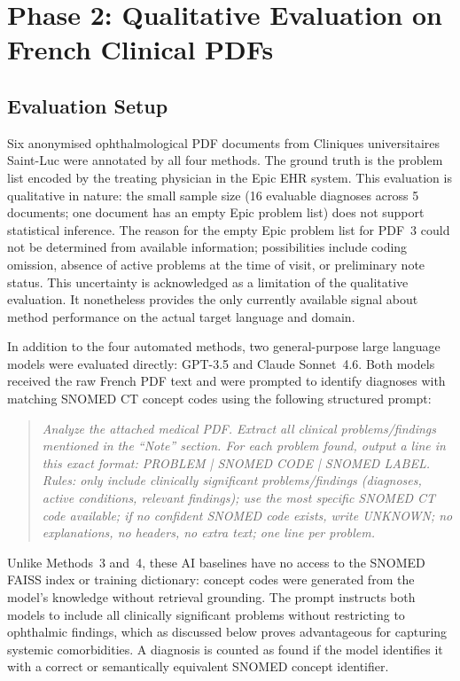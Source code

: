 \section{Phase 2: Qualitative Evaluation on French Clinical PDFs}

\subsection{Evaluation Setup}

Six anonymised ophthalmological PDF documents from Cliniques universitaires Saint-Luc were annotated by all four methods. The ground truth is the problem list encoded by the treating physician in the Epic EHR system. This evaluation is qualitative in nature: the small sample size (16 evaluable diagnoses across 5 documents; one document has an empty Epic problem list) does not support statistical inference. The reason for the empty Epic problem list for PDF~3 could not be determined from available information; possibilities include coding omission, absence of active problems at the time of visit, or preliminary note status. This uncertainty is acknowledged as a limitation of the qualitative evaluation. It nonetheless provides the only currently available signal about method performance on the actual target language and domain.

In addition to the four automated methods, two general-purpose large language models were evaluated directly: GPT-3.5 and Claude Sonnet~4.6. Both models received the raw French PDF text and were prompted to identify diagnoses with matching SNOMED CT concept codes using the following structured prompt:

\begin{quote}
\textit{Analyze the attached medical PDF. Extract all clinical problems/findings mentioned in the ``Note'' section. For each problem found, output a line in this exact format: PROBLEM | SNOMED CODE | SNOMED LABEL. Rules: only include clinically significant problems/findings (diagnoses, active conditions, relevant findings); use the most specific SNOMED CT code available; if no confident SNOMED code exists, write UNKNOWN; no explanations, no headers, no extra text; one line per problem.}
\end{quote}

Unlike Methods~3 and~4, these AI baselines have no access to the SNOMED FAISS index or training dictionary: concept codes were generated from the model's knowledge without retrieval grounding. The prompt instructs both models to include all clinically significant problems without restricting to ophthalmic findings, which as discussed below proves advantageous for capturing systemic comorbidities. A diagnosis is counted as found if the model identifies it with a correct or semantically equivalent SNOMED concept identifier.


